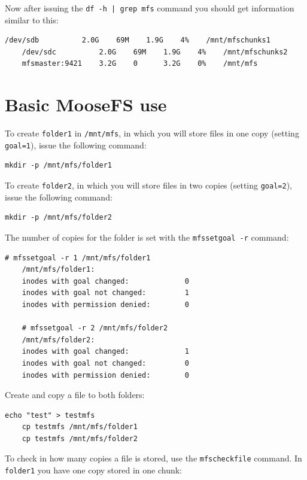 \documentclass[a4paper,11pt,english]{report}
\def\code#1{\texttt{#1}}
\begin{document}
			Now after issuing the \code{df -h | grep mfs} command you should get information similar to this:
			\begin{lstlisting}[caption={Result of \code{df -h | grep mfs}}]
	/dev/sdb          2.0G    69M    1.9G    4%    /mnt/mfschunks1
	/dev/sdc          2.0G    69M    1.9G    4%    /mnt/mfschunks2
	mfsmaster:9421    3.2G    0      3.2G    0%    /mnt/mfs
			\end{lstlisting}
			
	\chapter{Basic MooseFS use}
		To create \code{folder1} in \code{/mnt/mfs}, in which you will store files in one copy (setting \code{goal=1}), issue the following command:
		
		\begin{lstlisting}[caption={Making directory \#1}]
	mkdir -p /mnt/mfs/folder1
		\end{lstlisting}
		
		To create \code{folder2}, in which you will store files in two copies (setting \code{goal=2}), issue the following command:
		\begin{lstlisting}[caption={Making directory \#2}]
	mkdir -p /mnt/mfs/folder2
		\end{lstlisting}
		
		The number of copies for the folder is set with the \code{mfssetgoal -r} command:
		
		\begin{lstlisting}[caption={\code{mfssetgoal -r command}}]
	# mfssetgoal -r 1 /mnt/mfs/folder1
	/mnt/mfs/folder1:
	inodes with goal changed:             0
	inodes with goal not changed:         1
	inodes with permission denied:        0
	
	# mfssetgoal -r 2 /mnt/mfs/folder2
	/mnt/mfs/folder2:
	inodes with goal changed:             1
	inodes with goal not changed:         0
	inodes with permission denied:        0
		\end{lstlisting}
		
		Create and copy a file to both folders:
		
		\begin{lstlisting}[caption={Creating and copying a file to newly created folders}]
	echo "test" > testmfs
	cp testmfs /mnt/mfs/folder1
	cp testmfs /mnt/mfs/folder2
		\end{lstlisting}
		
		To check in how many copies a file is stored, use the \code{mfscheckfile} command. In \code{folder1} you have one copy stored in one chunk:
		
\end{document}
